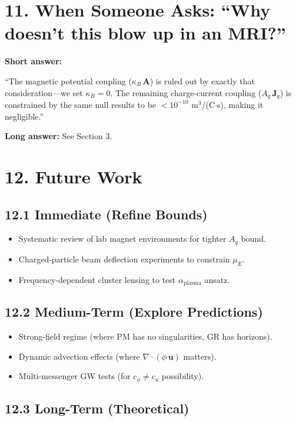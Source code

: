 \documentclass{article}
\begin{document}
\section*{11. When Someone Asks: ``Why doesn't this blow up in an MRI?''}

\textbf{Short answer:}

``The magnetic potential coupling ($\kappa_B\,\mathbf A$) is ruled out by
exactly that consideration—we set $\kappa_B = 0$. The remaining charge-current
coupling ($A_q\,\mathbf J_q$) is constrained by the same null results to be
$< 10^{-10}$ m$^3$/(C$\cdot$s), making it negligible.''

\textbf{Long answer:} See Section 3.

\section*{12. Future Work}

\subsection*{12.1 Immediate (Refine Bounds)}

\begin{itemize}
    \item Systematic review of lab magnet environments for tighter $A_q$ bound.
    \item Charged-particle beam deflection experiments to constrain $\mu_E$.
    \item Frequency-dependent cluster lensing to test $\alpha_{\text{plasma}}$ ansatz.
\end{itemize}

\subsection*{12.2 Medium-Term (Explore Predictions)}

\begin{itemize}
    \item Strong-field regime (where PM has no singularities, GR has horizons).
    \item Dynamic advection effects (where $\nabla\cdot(\phi\,\mathbf u)$ matters).
    \item Multi-messenger GW tests (for $c_\phi \neq c_u$ possibility).
\end{itemize}

\subsection*{12.3 Long-Term (Theoretical)}
\end{document}
